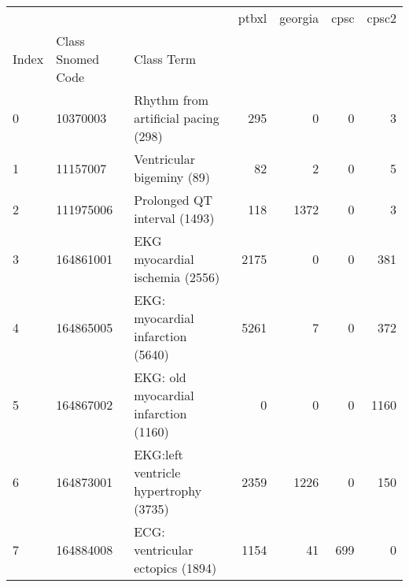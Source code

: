 \begin{tabular}{lllrrrr}
{} & {} & {} & {ptbxl} & {georgia} & {cpsc} & {cpsc2} \\
{Index} & {Class Snomed Code} & {Class Term} & {} & {} & {} & {} \\
0 & 10370003 & Rhythm from artificial pacing (298) & {\cellcolor[HTML]{2E8B57}} \color[HTML]{F1F1F1} 295 & {\cellcolor[HTML]{EBF3ED}} \color[HTML]{000000} 0 & {\cellcolor[HTML]{EBF3ED}} \color[HTML]{000000} 0 & {\cellcolor[HTML]{E9F2EC}} \color[HTML]{000000} 3 \\
1 & 11157007 & Ventricular bigeminy (89) & {\cellcolor[HTML]{2E8B57}} \color[HTML]{F1F1F1} 82 & {\cellcolor[HTML]{E7F0EA}} \color[HTML]{000000} 2 & {\cellcolor[HTML]{EBF3ED}} \color[HTML]{000000} 0 & {\cellcolor[HTML]{E0ECE4}} \color[HTML]{000000} 5 \\
2 & 111975006 & Prolonged QT interval (1493) & {\cellcolor[HTML]{DBEAE0}} \color[HTML]{000000} 118 & {\cellcolor[HTML]{2E8B57}} \color[HTML]{F1F1F1} 1372 & {\cellcolor[HTML]{EBF3ED}} \color[HTML]{000000} 0 & {\cellcolor[HTML]{EBF3ED}} \color[HTML]{000000} 3 \\
3 & 164861001 & EKG myocardial ischemia (2556) & {\cellcolor[HTML]{2E8B57}} \color[HTML]{F1F1F1} 2175 & {\cellcolor[HTML]{EBF3ED}} \color[HTML]{000000} 0 & {\cellcolor[HTML]{EBF3ED}} \color[HTML]{000000} 0 & {\cellcolor[HTML]{CAE1D3}} \color[HTML]{000000} 381 \\
4 & 164865005 & EKG: myocardial infarction (5640) & {\cellcolor[HTML]{2E8B57}} \color[HTML]{F1F1F1} 5261 & {\cellcolor[HTML]{EBF3ED}} \color[HTML]{000000} 7 & {\cellcolor[HTML]{EBF3ED}} \color[HTML]{000000} 0 & {\cellcolor[HTML]{DEEBE3}} \color[HTML]{000000} 372 \\
5 & 164867002 & EKG: old myocardial infarction (1160) & {\cellcolor[HTML]{EBF3ED}} \color[HTML]{000000} 0 & {\cellcolor[HTML]{EBF3ED}} \color[HTML]{000000} 0 & {\cellcolor[HTML]{EBF3ED}} \color[HTML]{000000} 0 & {\cellcolor[HTML]{2E8B57}} \color[HTML]{F1F1F1} 1160 \\
6 & 164873001 & EKG:left ventricle hypertrophy (3735) & {\cellcolor[HTML]{2E8B57}} \color[HTML]{F1F1F1} 2359 & {\cellcolor[HTML]{88BD9F}} \color[HTML]{000000} 1226 & {\cellcolor[HTML]{EBF3ED}} \color[HTML]{000000} 0 & {\cellcolor[HTML]{DFECE4}} \color[HTML]{000000} 150 \\
7 & 164884008 & ECG: ventricular ectopics (1894) & {\cellcolor[HTML]{2E8B57}} \color[HTML]{F1F1F1} 1154 & {\cellcolor[HTML]{E4EFE8}} \color[HTML]{000000} 41 & {\cellcolor[HTML]{78B492}} \color[HTML]{F1F1F1} 699 & {\cellcolor[HTML]{EBF3ED}} \color[HTML]{000000} 0 \\

\end{tabular}

